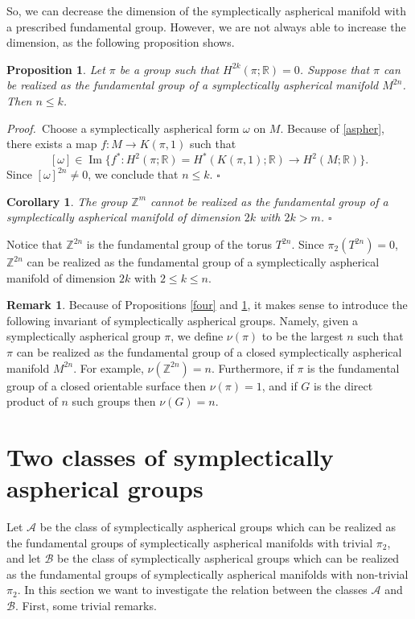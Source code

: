 \documentclass[12pt, twoside]{amsart}
\theoremstyle{plain}
\newtheorem{prop}[theorem]{Proposition}
\newtheorem{cory}[theorem]{Corollary}
\theoremstyle{definition}
\newtheorem{remark}[theorem]{Remark}
\numberwithin{equation}{section}
\def\RR{\mathbb R}
\def\ZZ{\mathbb Z}
\def\Im{\operatorname {Im}}
\def\hqed{\hfill\hfill$\square$}
\def\AAA{{\mathcal A}}
\def\BBB{{\mathcal B}}
\def\RR{\mathbb R}
\def\ZZ{\mathbb Z}
\def\m{\medskip}
\def\p{{\it Proof.\ }}
\begin{document}
\m So, we can decrease the dimension of the symplectically aspherical manifold 
with a prescribed fundamental group. However, we are not always able to 
increase the dimension, as the following proposition shows.

\begin{prop} \label{dim}
Let $\pi$ be a group such that $H^{2k}(\pi;\RR)=0$. Suppose that $\pi$ 
can be realized  as the fundamental group of a symplectically aspherical 
manifold $M^{2n}$. Then $n\le k$. 
\end{prop}

\p Choose a symplectically aspherical form $\omega$ on $M$. Because of 
\ref{aspher}, there exists a map $f: M \to K(\pi,1)$ such that 
$$ 
[\omega]\in \Im \{f^*: H^2(\pi;\RR)=H^*(K(\pi,1);\RR) \to H^2(M;\RR)\}.
$$ 
Since $[\omega]^{2n}\ne 0$, we conclude that $n \le k$.
\hqed 

\begin{cory} The group $\ZZ^{m}$ cannot be realized as the
fundamental group of a symplectically aspherical manifold of dimension $2k$
with $2k>m$.
\hqed
\end{cory}

\m Notice that $\ZZ^{2n}$ is the fundamental group of the torus $T^{2n}$. 
Since
$\pi_2(T^{2n})=0$,  $\ZZ^{2n}$ can be realized as the fundamental group of a
symplectically aspherical manifold of dimension $2k$ with $2\le k \le n$.

\begin{remark} \rm Because of Propositions \ref{four} and \ref{dim}, it makes 
sense to introduce the following invariant of symplectically aspherical 
groups. 
Namely, given a symplectically aspherical group $\pi$, we define $\nu(\pi)$ to 
be the largest $n$ such that $\pi$ can be realized as the fundamental group of 
a closed symplectically aspherical manifold $M^{2n}$. For example, 
$\nu(\ZZ^{2n})=n$. Furthermore, if $\pi$ is the fundamental group of a closed 
orientable surface then $\nu(\pi)=1$, and if $G$ is the direct product of $n$ 
such groups then $\nu(G)=n$.
\end{remark}


\section{Two classes of symplectically aspherical groups}\label{classes} 

Let $\AAA$ be the class of symplectically aspherical groups which can be
realized as the fundamental groups of symplectically aspherical manifolds with
trivial $\pi_2$, and let $\BBB$ be the class of symplectically aspherical
groups which can be realized as the fundamental groups of symplectically
aspherical manifolds with non-trivial $\pi_2$. In this section we want to
investigate the relation between the classes $\AAA$ and $\BBB$. First, some
trivial remarks.
\end{document}
